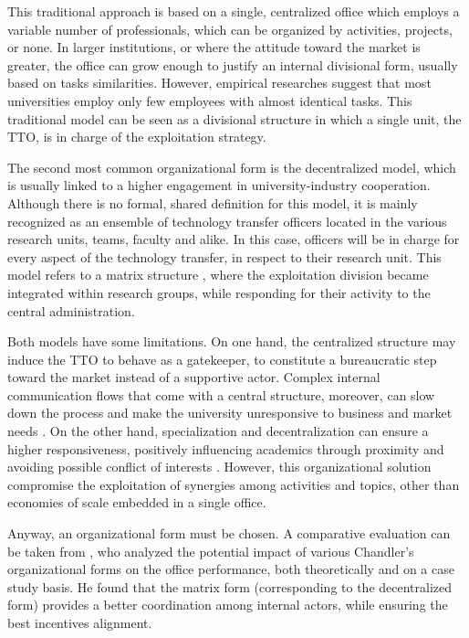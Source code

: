 This traditional approach is based on a single, centralized office which employs a variable number of professionals, which can be organized by activities, projects, or none. In larger institutions, or where the attitude toward the market is greater, the office can grow enough to justify an internal divisional form, usually based on tasks similarities. However, empirical researches suggest that most universities employ only few employees with almost identical tasks. This traditional model can be seen as a divisional structure in which a single unit, the TTO, is in charge of the exploitation strategy. 

The second most common organizational form is the decentralized model, which is usually linked to a higher engagement in university-industry cooperation. Although there is no formal, shared definition for this model, it is mainly recognized as an ensemble of technology transfer officers located in the various research units, teams, faculty and alike. In this case, officers will be in charge for every aspect of the technology transfer, in respect to their research unit. This model refers to a matrix structure \citep{Debackere2005}, where the exploitation division became integrated within research groups, while responding for their activity to the central administration.

Both models have some limitations. On one hand, the centralized structure may induce the TTO to behave as a gatekeeper, to constitute a bureaucratic step toward the market instead of a supportive actor. Complex internal communication flows that come with a central structure, moreover, can slow down the process and make the university unresponsive to business and market needs \citep{Litan2008}. On the other hand, specialization and decentralization can ensure a higher responsiveness, positively influencing academics through proximity and avoiding possible conflict of interests \citep{Debackere2005}. However, this organizational solution compromise the exploitation of synergies among activities and topics, other than economies of scale embedded in a single office.

Anyway, an organizational form must be chosen. A comparative evaluation can be taken from \citet{Bercovitz2001}, who analyzed the potential impact of various Chandler's organizational forms on the office performance, both theoretically and on a case study basis. He found that the matrix form (corresponding to the decentralized form) provides a better coordination among internal actors, while ensuring the best incentives alignment. 

